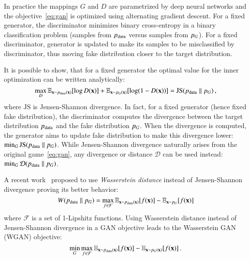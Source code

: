 In practice the mappings $G$ and $D$ are parametrized by deep neural networks and the objective~\cref{eq:gan} is optimized using alternating gradient descent. For a fixed generator, the discriminator minimizes binary cross-entropy in a binary classification problem (samples from $p_{\text{data}}$ versus samples from $ p_{G} $). For a fixed discriminator, generator is updated to make its samples to be misclassified by discriminator, thus moving fake distribution closer to the target distribution.   

It is possible to show, that for a fixed generator the optimal value for the inner optimization can be written analytically: 
\begin{equation}\label{eq:js}
\max_D \mathbb{E}_{\mathbf{x} \sim p_{\text{data}}(\mathbf{x})} [\log D(\mathbf{x})] + \mathbb{E}_{\mathbf{x} \sim  p_{G} (\mathbf{x})} [\log(1 - D(\mathbf{x}))] = \text{JS}( p_{\text{data}} \;\|\;  p_{G} )\, , 
\end{equation} 
where $\text{JS}$ is Jensen-Shannon divergence. In fact, for a fixed generator (hence fixed fake distribution), the discriminator computes the divergence between the target distribution $p_{\text{data}}$ and the fake distribution $ p_{G} $. When the divergence is computed, the generator aims to update fake distribution to make this divergence lower: $\min_G \text{JS}( p_{\text{data}} \;\|\;  p_{G}  )$. While Jensen-Shannon divergence naturally arises from the original game~\cref{eq:gan}, any divergence or distance $\mathcal{D}$ can be used instead: $\min_G \mathcal{D}( p_{\text{data}} \;\|\;  p_{G}  )$.

A recent work~\cite{arjovsky2017wasserstein} proposed to use \textit{Wasserstein distance} instead of Jensen-Shannon divergence proving its better behavior:
\begin{equation}\label{eq:wasserstein_metric}
W(p_{\text{data}} \;\|\;  p_{G}  ) = \max_{f \in \mathcal{F}} \mathbb{E}_{\mathbf{x} \sim p_{\text{data}}(\mathbf{x})}[f(\mathbf{x})] - \mathbb{E}_{\mathbf{x} \sim  p_{G} } [f(\mathbf{x})]
\end{equation}
where $\mathcal{F}$ is a set of 1-Lipshitz functions. Using Wasserstein distance instead of Jensen-Shannon divergence in a GAN objective leads to the Wasserstein GAN (WGAN) objective: 
\begin{equation}\label{eq:wgan}
\min_G \max_{f \in \mathcal{F}} \mathbb{E}_{\mathbf{x} \sim p_{\text{data}}(\mathbf{x})}[f(\mathbf{x})] - \mathbb{E}_{\mathbf{x} \sim  p_{G} (\mathbf{x})} [f(\mathbf{x})]\, .
\end{equation}

